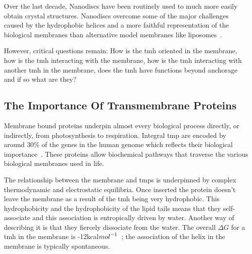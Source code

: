 
 Over the last decade, Nanodiscs have been routinely used to much more easily obtain crystal structures. Nanodiscs overcome some of the major challenges caused by the hydrophobic helices and a more faithful representation of the biological membranes than alternative model membranes like liposomes~\cite{Borch2009}.

 However, critical questions remain: How is the \gls{tmh} oriented in the membrane, how is the \gls{tmh} interacting with the membrane, how is the \gls{tmh} interacting with another \gls{tmh} in the membrane, does the \gls{tmh} have functions beyond anchorage and if so what are they?




\subsection{The Importance Of Transmembrane Proteins}
Membrane bound proteins underpin almost every biological process directly, or indirectly, from photosynthesis to respiration. Integral \gls{tmp} are encoded by around 30\% of the genes in the human genome which reflects their biological importance~\cite{Almen2009}. These proteins allow biochemical pathways that traverse the various biological membranes used in life. %

The relationship between the membrane and \gls{tmp}s is underpinned by complex thermodynamic and electrostatic equilibria. Once inserted the protein doesn't leave the membrane as a result of the \gls{tmh} being very hydrophobic. This hydrophobicity and the hydrophobicity of the lipid tails means that they self-associate and this association is entropically driven by water. Another way of describing it is that they fiercely dissociate from the water. The overall $\Delta G$ for a \gls{tmh} in the membrane is -12kcal${mol}^{\--1}$~\cite{Cymer2015}; the association of the helix in the membrane is typically spontaneous.

